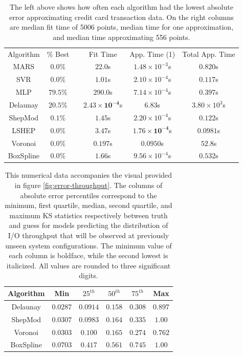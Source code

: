 \documentclass[smallextended,final]{svjour3}       %
\begin{document}
\begin{appendix}
\begin{table}
  \centering
  \begin{tabular}{|c|c| c |c|c|c|}
    \cline{1-2}\cline{4-6}
    Algorithm & \% Best &  & Fit Time & App. Time (1) & Total App. Time\\
    \cline{1-2}\cline{4-6}
    MARS & $0.0\%$ &  & $22.0$s & $1.48 \times 10^{-3}$s & $0.820$s\\
    SVR & $0.0\%$ &  & $1.01$s & $\mathit{2.10 \times 10^{-4}}$s & $\mathit{0.117}$s\\
    MLP & $\mathbf{79.5}\%$ &  & $290.0$s & $7.14 \times 10^{-4}$s & $0.397$s\\
    Delaunay & $\mathit{20.5}\%$ &  & $\mathbf{2.43 \times 10^{-4}}$s & $6.83$s & $3.80 \times 10^{3}$s\\
    ShepMod & $0.1\%$ &  & $1.45$s & $2.20 \times 10^{-4}$s & $0.122$s\\
    LSHEP & $0.0\%$ &  & $3.47$s & $\mathbf{1.76 \times 10^{-4}}$s & $\mathbf{0.0981}$s\\
    Voronoi & $0.0\%$ &  & $\mathit{0.197}$s & $0.0950$s & $52.8$s\\
    BoxSpline & $0.0\%$ &  & $1.66$s & $9.56 \times 10^{-4}$s & $0.532$s\\
    \cline{1-2}\cline{4-6}
  \end{tabular}
  \caption{The left above shows how often each algorithm had the lowest absolute error approximating credit card transaction data. On the right columns are median fit time of 5006 points, median time for one approximation, and median time approximating 556 points.}
  \label{table:best-credit-card}
\end{table}



\begin{table}
  \centering
  \begin{tabular}{c|c|c|c|c|c}
    \hline
    Algorithm & Min & $25^{th}$ & $50^{th}$ & $75^{th}$ & Max\\
    \hline
    Delaunay & $\mathbf{0.0287}$ & $\mathbf{0.0914}$ & $\mathbf{0.158}$ & $\mathit{0.308}$ & $\mathit{0.897}$\\
    ShepMod & $0.0307$ & $\mathit{0.0983}$ & $\mathit{0.164}$ & $0.335$ & $1.00$\\
    Voronoi & $\mathit{0.0303}$ & $0.100$ & $0.165$ & $\mathbf{0.274}$ & $\mathbf{0.762}$\\
    BoxSpline & $0.0703$ & $0.417$ & $0.561$ & $0.745$ & $1.00$\\
    \hline
  \end{tabular}
  \caption{This numerical data accompanies the visual provided in figure \ref{fig:error-throughput}. The columns of absolute error percentiles correspond to the minimum, first quartile, median, second quartile, and maximum KS statistics respectively between truth and guess for models predicting the distribution of I/O throughput that will be observed at previously unseen system configurations. The minimum value of each column is boldface, while the second lowest is italicized. All values are rounded to three significant digits.}
  \label{table:error-throughput}
\end{table}


\end{appendix}
\end{document}
